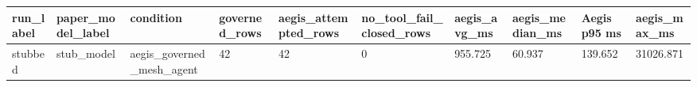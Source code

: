 \begin{tabular}{llllllllll}
 \hline
run\_label & paper\_model\_label & condition & governed\_rows & aegis\_attempted\_rows & no\_tool\_fail\_closed\_rows & aegis\_avg\_ms & aegis\_median\_ms & Aegis p95 ms & aegis\_max\_ms \\
 \hline
stubbed & stub\_model & aegis\_governed\_mesh\_agent & 42 & 42 & 0 & 955.725 & 60.937 & 139.652 & 31026.871 \\
 \hline
\end{tabular}
